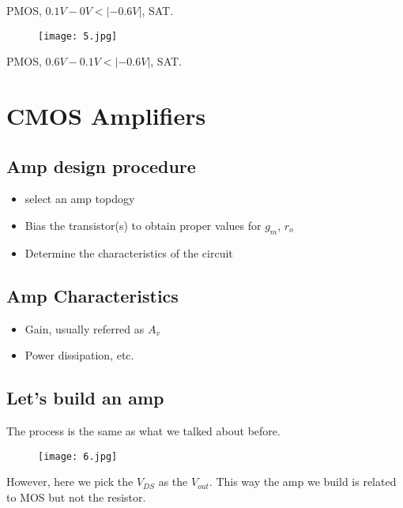 \documentclass[fontset=windows]{article}
\begin{document}
PMOS, $0.1V-0V<|-0.6V|$, SAT. 

\begin{figure}[htbp]
    \centering
    \texttt{[image: 5.jpg]}
    \captionsetup{labelformat=empty}
    \caption{}
    \label{5}
\end{figure}

PMOS, $0.6V-0.1V<|-0.6V|$, SAT. 

\section*{CMOS Amplifiers}

\subsection*{Amp design procedure}

\begin{itemize}
    \item select an amp topdogy
    \item Bias the transistor(s) to obtain proper values for $g_m$, $r_o$
    \item Determine the characteristics of the circuit
\end{itemize}

\subsection*{Amp Characteristics}

\begin{itemize}
    \item Gain, usually referred as $A_v$
    \item Power dissipation, etc. 
\end{itemize}

\subsection*{Let's build an amp}

The process is the same as what we talked about before. 

\begin{figure}[htbp]
    \centering
    \texttt{[image: 6.jpg]}
    \captionsetup{labelformat=empty}
    \caption{}
    \label{6}
\end{figure}

However, here we pick the $V_{DS}$ as the $V_{out}$. This way the amp we build is related to MOS but not the resistor. 
\end{document}
